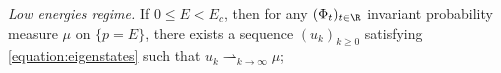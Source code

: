 \item\label{theorem:maini} \emph{Low energies regime.} If $0 \leq E < E_c$, then for any $(\Phi_t)_{t \in \R}$ invariant probability measure $\mu$ on $\{p=E\}$, there exists a sequence $(u_{k})_{k \geq 0}$ satisfying \eqref{equation:eigenstates} such that $u_{k} \rightharpoonup_{k \to \infty} \mu$;
